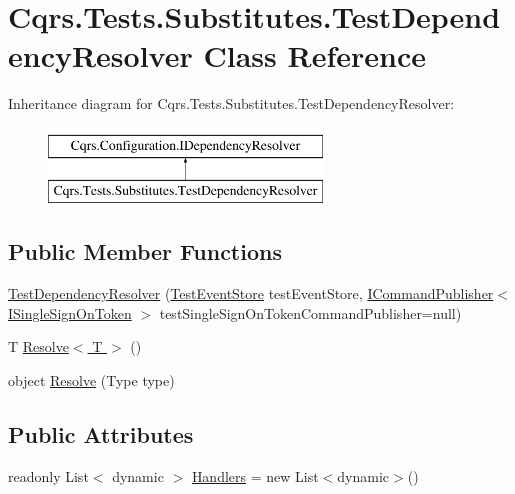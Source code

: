 \hypertarget{classCqrs_1_1Tests_1_1Substitutes_1_1TestDependencyResolver}{}\section{Cqrs.\+Tests.\+Substitutes.\+Test\+Dependency\+Resolver Class Reference}
\label{classCqrs_1_1Tests_1_1Substitutes_1_1TestDependencyResolver}
Inheritance diagram for Cqrs.\+Tests.\+Substitutes.\+Test\+Dependency\+Resolver\+:\begin{figure}[H]
\begin{center}
\leavevmode
\includegraphics[height=2.000000cm]{classCqrs_1_1Tests_1_1Substitutes_1_1TestDependencyResolver}
\end{center}
\end{figure}
\subsection*{Public Member Functions}
\begin{DoxyCompactItemize}
\item 
\hyperlink{classCqrs_1_1Tests_1_1Substitutes_1_1TestDependencyResolver_ad2c04971107ccbd80aa3f5c0440438cb}{Test\+Dependency\+Resolver} (\hyperlink{classCqrs_1_1Tests_1_1Substitutes_1_1TestEventStore}{Test\+Event\+Store} test\+Event\+Store, \hyperlink{interfaceCqrs_1_1Commands_1_1ICommandPublisher}{I\+Command\+Publisher}$<$ \hyperlink{interfaceCqrs_1_1Authentication_1_1ISingleSignOnToken}{I\+Single\+Sign\+On\+Token} $>$ test\+Single\+Sign\+On\+Token\+Command\+Publisher=null)
\item 
T \hyperlink{classCqrs_1_1Tests_1_1Substitutes_1_1TestDependencyResolver_a67090a882241fa6a881d49c91c95cad7}{Resolve$<$ T $>$} ()
\item 
object \hyperlink{classCqrs_1_1Tests_1_1Substitutes_1_1TestDependencyResolver_a05767824475ea6affbf6f70cf5b1fd06}{Resolve} (Type type)
\end{DoxyCompactItemize}
\subsection*{Public Attributes}
\begin{DoxyCompactItemize}
\item 
readonly List$<$ dynamic $>$ \hyperlink{classCqrs_1_1Tests_1_1Substitutes_1_1TestDependencyResolver_a6fd9194240dd3d95fec9ba3788ac67e4}{Handlers} = new List$<$dynamic$>$()
\end{DoxyCompactItemize}
